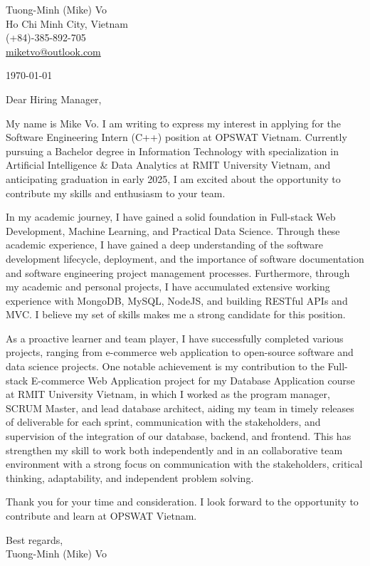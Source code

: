 \documentclass[a4paper,11pt]{article}
\makeatletter
\newcommand{\header}{
  \small{
    Tuong-Minh (Mike) Vo\\
    Ho Chi Minh City, Vietnam\\
    (+84)-385-892-705\\
    \href{mailto:miketvo@outlook.com}{miketvo@outlook.com}
  }
  \par\noindent\hrulefill
}
\newcommand{\p}[1]{#1\\\vspace{6pt}}
\makeatother
\begin{document}
\header

\p{\today}

\p{Dear Hiring Manager,}

\p{My name is Mike Vo. I am writing to express my interest in applying for the Software Engineering Intern (C++) position at OPSWAT Vietnam. Currently pursuing a Bachelor degree in Information Technology with specialization in Artificial Intelligence \& Data Analytics at RMIT University Vietnam, and anticipating graduation in early 2025, I am excited about the opportunity to contribute my skills and enthusiasm to your team.}

\p{In my academic journey, I have gained a solid foundation in Full-stack Web Development, Machine Learning, and Practical Data Science. Through these academic experience, I have gained a deep understanding of the software development lifecycle, deployment, and the importance of software documentation and software engineering project management processes. Furthermore, through my academic and personal projects, I have accumulated extensive working experience with MongoDB, MySQL, NodeJS, and building RESTful APIs and MVC. I believe my set of skills makes me a strong candidate for this position.}

\p{As a proactive learner and team player, I have successfully completed various projects, ranging from e-commerce web application to open-source software and data science projects. One notable achievement is my contribution to the Full-stack E-commerce Web Application project for my Database Application course at RMIT University Vietnam, in which I worked as the program manager, SCRUM Master, and lead database architect, aiding my team in timely releases of deliverable for each sprint, communication with the stakeholders, and supervision of the integration of our database, backend, and frontend. This has strengthen my skill to work both independently and in an collaborative team environment with a strong focus on communication with the stakeholders, critical thinking, adaptability, and independent problem solving.}

\p{Thank you for your time and consideration. I look forward to the opportunity to contribute and learn at OPSWAT Vietnam.}

\p{Best regards,\\
Tuong-Minh (Mike) Vo}
%
\end{document}
